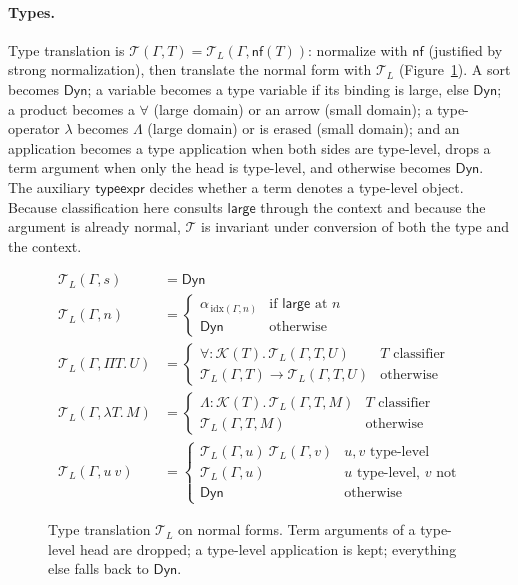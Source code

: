 \documentclass[acmsmall,anonymous=false,nonacm]{acmart}
\newcommand{\dyn}{\ensuremath{\mathsf{Dyn}}}
\newcommand{\extt}{\mathcal{T}}
\newcommand{\extk}{\mathcal{K}}
\newcommand{\islarge}{\mathsf{large}}
\newcommand{\nf}{\mathsf{nf}}
\begin{document}
\paragraph{Types.}
Type translation is $\extt(\Gamma, T) = \extt_L(\Gamma, \nf(T))$: normalize with
$\nf$ (justified by strong normalization), then translate the normal form with
$\extt_L$ (Figure~\ref{fig:extt}). A sort becomes $\dyn$; a variable becomes a
type variable if its binding is large, else $\dyn$; a product becomes a
$\forall$ (large domain) or an arrow (small domain); a type-operator
$\lambda$ becomes $\Lambda$ (large domain) or is erased (small domain); and an
application becomes a type application when both sides are type-level, drops a
term argument when only the head is type-level, and otherwise becomes $\dyn$.
The auxiliary $\mathsf{typeexpr}$ decides whether a term denotes a type-level
object. Because classification here consults $\islarge$ through the context and
because the argument is already normal, $\extt$ is invariant under conversion of
both the type and the context.

\begin{figure}
\small
\begin{align*}
\extt_L(\Gamma, s) &= \dyn \\
\extt_L(\Gamma, n) &= \begin{cases}
   \alpha_{\,\mathrm{idx}(\Gamma,n)} & \text{if $\islarge$ at $n$} \\
   \dyn & \text{otherwise}
 \end{cases}\\
\extt_L(\Gamma, \Pi T.\,U) &= \begin{cases}
   \forall{:}\extk(T).\,\extt_L(\Gamma{,}T, U) & \text{$T$ classifier}\\
   \extt_L(\Gamma, T) \to \extt_L(\Gamma{,}T, U) & \text{otherwise}
 \end{cases}\\
\extt_L(\Gamma, \lambda T.\,M) &= \begin{cases}
   \Lambda{:}\extk(T).\,\extt_L(\Gamma{,}T, M) & \text{$T$ classifier}\\
   \extt_L(\Gamma{,}T, M) & \text{otherwise}
 \end{cases}\\
\extt_L(\Gamma, u\ v) &= \begin{cases}
   \extt_L(\Gamma,u)\ \extt_L(\Gamma,v) & \text{$u,v$ type-level}\\
   \extt_L(\Gamma, u) & \text{$u$ type-level, $v$ not}\\
   \dyn & \text{otherwise}
 \end{cases}
\end{align*}
\caption{Type translation $\extt_L$ on normal forms. Term arguments of a
type-level head are dropped; a type-level application is kept; everything else
falls back to $\dyn$.}
\label{fig:extt}
\end{figure}
\end{document}
